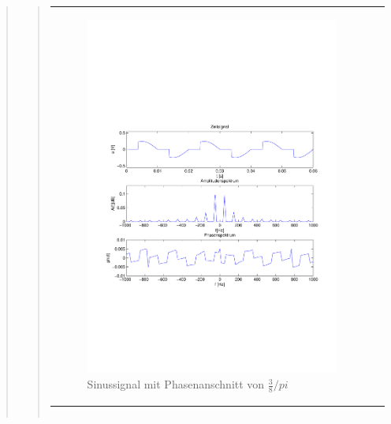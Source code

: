 \begin{quote}
\begin{quote}
\begin{center}
\begin{tabular}{ll}
\begin{minipage}{0.6\textwidth}
                     \begin{figure}[H]
                        \label{fig:}
                        \includegraphics[scale=0.5, trim = 2cm 7cm 1.5cm 8.5cm, clip]{./Bilder/Phasenanschnitt38pi.pdf} %
                        \caption{Sinussignal mit Phasenanschnitt von $\frac{3}{8}/pi$}
                    \end{figure}
               \vspace{-1.5em}

                \end{minipage}

            \end{tabular}
            \end{center}

            \begin{center}
            \begin{tabular}{ll}


\end{tabular}
\end{center}
\end{quote}
\end{quote}
